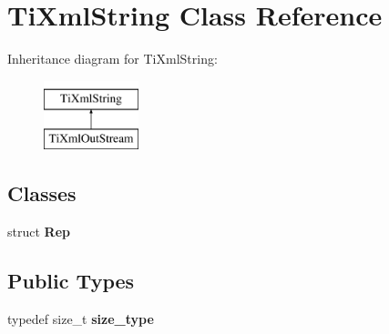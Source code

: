 \hypertarget{classTiXmlString}{\section{\-Ti\-Xml\-String \-Class \-Reference}
\label{classTiXmlString}
}
\-Inheritance diagram for \-Ti\-Xml\-String\-:\begin{figure}[H]
\begin{center}
\leavevmode
\includegraphics[height=2.000000cm]{classTiXmlString}
\end{center}
\end{figure}
\subsection*{\-Classes}
\begin{DoxyCompactItemize}
\item 
struct {\bfseries \-Rep}
\end{DoxyCompactItemize}
\subsection*{\-Public \-Types}
\begin{DoxyCompactItemize}
\item 
\hypertarget{classTiXmlString_abeb2c1893a04c17904f7c06546d0b971}{typedef size\-\_\-t {\bfseries size\-\_\-type}}\label{classTiXmlString_abeb2c1893a04c17904f7c06546d0b971}

\end{DoxyCompactItemize}
